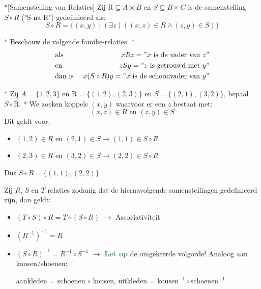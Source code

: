 
\begin{nicedefinition}*[Samenstelling van Relaties]
    Zij $\text{R} \subseteq A \times B$ en $S \subseteq B \times C$
    \nextpart[Dan] is de samenstelling $S \circ R$ ("S na R") gedefinieerd als:
    \begin{equation*}
        S \circ R = \{(x,y)\; |\; (\exists z)\left((x,z) \in R \land (z,y) \in S\right)\}
    \end{equation*}
\end{nicedefinition}

\begin{niceexample}*
    Beschouw de volgende familie-relaties:
    \nextpart[]*
    \begin{equation*}
        \begin{aligned}
            &\text{als } &xRz = "x \text{ is de vader van } z" \\
            &\text{en } &zSy = "z \text{ is getrouwd met } y" \\
            &\text{dan is } &x(S \circ R)y = "x \text{ is de schoonvader van } y" \\
        \end{aligned}
    \end{equation*}
\end{niceexample}

\newpage
\begin{niceexample}*
    Zij $A = \{1,2,3\}$ en $\text{R}=\{(1,2), (2,3)\}$ en $S = \{(2,1), (3,2)\}$, bepaal $S \circ \text{R}$.
    \nextpart[Oplossing:]*
    We zoeken koppels $(x,y)$ waarvoor er een $z$ bestaat met:
    \begin{equation*}
        (x,z) \in R \text{ en } (z,y) \in S
    \end{equation*}
    Dit geldt voor:
    \begin{itemize}
        \item $(1,2) \in R$ en $(2,1) \in S \longrightarrow (1,1) \in S \circ R$
        \item $(2,3) \in R$ en $(3,2) \in S \longrightarrow (2,2) \in S \circ R$
    \end{itemize}
    Dus $S \circ R = \{(1,1), (2,2)\}$.
\end{niceexample}


Zij $R$, $S$ en $T$ relaties zodanig dat de hiernavolgende samenstellingen gedefinieerd zijn, dan geldt:
\begin{itemize}
    \item $(T \circ S) \circ R = T \circ (S \circ R)$ $\longrightarrow$ Associativiteit
    \item $(R^{-1})^{-1} = R$
    \item $(S \circ R)^{-1} = R^{-1} \circ S^{-1}$ $\longrightarrow$ \textcolor{SeaGreen}{\textbf{Let op}} de omgekeerde volgorde! Analoog aan kousen/shoenen:
    \begin{center}
        aankleden = schoenen $\circ$ kousen, uitkleden = $\text{kousen}^{-1} \circ \text{schoenen}^{-1}$
    \end{center}
\end{itemize}

